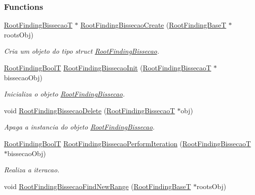 \subsubsection*{Functions}
\begin{CompactItemize}
\item 
\hyperlink{structRootFindingBissecao}{RootFindingBissecaoT} $\ast$ \hyperlink{group____bissecao_g01fb79a4dd7e1f53eb1233f262528f66}{RootFindingBissecaoCreate} (\hyperlink{structRootFindingBase}{RootFindingBaseT} $\ast$rootsObj)
\begin{CompactList}\small\item\em Cria um objeto do tipo struct \hyperlink{structRootFindingBissecao}{RootFindingBissecao}. \item\end{CompactList}\item 
\hyperlink{RootFindingCommon_8h_31228d356f5429fa5ba7f206e4dee12f}{RootFindingBoolT} \hyperlink{group____bissecao_g565bfd11019354823afbcffe501801c8}{RootFindingBissecaoInit} (\hyperlink{structRootFindingBissecao}{RootFindingBissecaoT} $\ast$bissecaoObj)
\begin{CompactList}\small\item\em Inicializa o objeto \hyperlink{structRootFindingBissecao}{RootFindingBissecao}. \item\end{CompactList}\item 
void \hyperlink{group____bissecao_g9c2a72c616c6ae34254a9a807394ecb5}{RootFindingBissecaoDelete} (\hyperlink{structRootFindingBissecao}{RootFindingBissecaoT} $\ast$obj)
\begin{CompactList}\small\item\em Apaga a instancia do objeto \hyperlink{structRootFindingBissecao}{RootFindingBissecao}. \item\end{CompactList}\item 
\hyperlink{RootFindingCommon_8h_31228d356f5429fa5ba7f206e4dee12f}{RootFindingBoolT} \hyperlink{group____bissecao_g00f707bfd08d203eb0b941b6b09e5639}{RootFindingBissecaoPerformIteration} (\hyperlink{structRootFindingBissecao}{RootFindingBissecaoT} $\ast$bissecaoObj)
\begin{CompactList}\small\item\em Realiza a iteracao. \item\end{CompactList}\item 
void \hyperlink{group____bissecao_gee709dc3b98a74148de8312b12373bcc}{RootFindingBissecaoFindNewRange} (\hyperlink{structRootFindingBase}{RootFindingBaseT} $\ast$rootsObj)

\end{CompactItemize}
